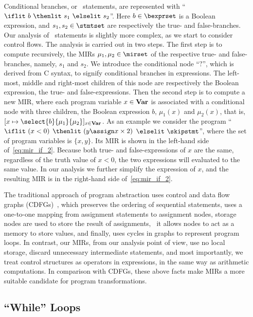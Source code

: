 Conditional branches, or \iflit~statements, are represented with ``$\iflit~
b~ \thenlit~ s_1~ \elselit~ s_2$''.  Here $b \in \bexprset$ is a Boolean
expression, and $s_1, s_2 \in \stmtset$ are respectively the true- and
false-branches.  Our analysis of \iflit~statements is slightly more complex,
as we start to consider control flows.  The analysis is carried out in two
steps.  The first step is to compute recursively, the MIRs $\mu_1, \mu_2
\in \mirset$ of the respective true- and false-branches, namely, $s_1$ and
$s_2$.  We introduce the conditional node ``$?$'', which is derived from
C syntax, to signify conditional branches in expressions.  The left-most,
middle and right-most children of this node are respectively the Boolean
expression, the true- and false-expressions.  Then the second step is to
compute a new MIR, where each program variable $x \in \mathbf{Var}$ is associated
with a conditional node with three children, the Boolean expression $b$,
$\mu_1(x)$ and $\mu_2(x)$, that is, $[x \mapsto \select{b}{\mu_1}{\mu_2}]_{x
\in \varset}$.  As an example we consider the program ``$\iflit~(x < 0)$
$\thenlit~(y \assign x \times 2)$ $\elselit~\skipstmt$'', where the set of
program variables is $\{x, y\}$.  Its MIR is shown in the left-hand side
of~\eqref{eq:mir_if_2}.  Because both true- and false-expressions of $x$
are the same, regardless of the truth value of $x < 0$, the two expressions
will evaluated to the same value.  In our analysis we further simplify
the expression of $x$, and the resulting MIR is in the right-hand side
of~\eqref{eq:mir_if_2}. 

The traditional approach of program abstraction uses control and data flow
graphs (CDFGs)~\cite{namballa04}, which preserves the ordering of sequential
statements, uses a one-to-one mapping from assignment statements to assignment
nodes, storage nodes are used to store the result of assignments, \ie~it allows
nodes to act as a memory to store values, and finally, uses cycles in graphs
to represent program loops.  In contrast, our MIRs, from our analysis point of
view, use no local storage, discard unnecessary intermediate statements, and
most importantly, we treat control structures as operators in expressions, in
the same way as arithmetic computations.  In comparison with CDFGs, these above
facts make MIRs a more suitable candidate for program transformations.

\subsection{``While'' Loops}

